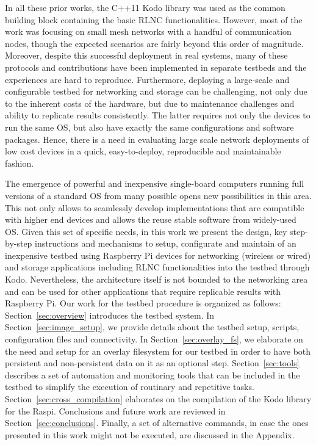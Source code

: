 In all these prior works, the C++11 Kodo library \cite{kodo2011pedersen} was used as the common building block containing the basic \ac{RLNC} functionalities. However, most of the work was focusing on small mesh networks with a handful of communication nodes, though the expected scenarios are fairly beyond this order of magnitude. Moreover, despite this successful deployment in real systems, many of these protocols and contributions have been implemented in separate testbeds and the experiences are hard to reproduce. Furthermore, deploying a large-scale and configurable testbed for networking and storage can be challenging, not only due to the inherent costs of the hardware, but due to maintenance challenges and ability to replicate results consistently. The latter requires not only the devices to run the same \ac{OS}, but also have exactly the same configurations and software packages. Hence, there is a need in evaluating large scale network deployments of low cost devices in a quick, easy-to-deploy, reproducible and maintainable fashion.

The emergence of powerful and inexpensive single-board computers running full versions of a standard \ac{OS} from many possible opens new possibilities in this area. This not only allows to seamlessly develop implementations that are compatible with higher end devices and allows the reuse stable software from widely-used \ac{OS}. Given this set of specific needs, in this work we present the design, key step-by-step instructions and mechanisms to setup, configurate and maintain of an inexpensive testbed using Raspberry Pi devices for networking (wireless or wired) and storage applications including \ac{RLNC} functionalities into the testbed through Kodo. Nevertheless, the architecture itself is not bounded to the networking area and can be used for other applications that require replicable results with Raspberry Pi. Our work for the testbed procedure is organized as follows: Section~\ref{sec:overview} introduces the testbed system. In Section~\ref{sec:image_setup}, we provide details about the testbed setup, scripts, configuration files and connectivity. In Section~\ref{sec:overlay_fs}, we elaborate on the need and setup for an overlay filesystem for our testbed in order to have both persistent and non-persistent data on it as an optional step. Section~\ref{sec:tools} describes a set of automation and monitoring tools that can be included in the testbed to simplify the execution of routinary and repetitive tasks. Section~\ref{sec:cross_compilation} elaborates on the compilation of the Kodo library for the \ac{Raspi}. Conclusions and future work are reviewed in Section~\ref{sec:conclusions}. Finally, a set of alternative commands, in case the ones presented in this work might not be executed, are discussed in the Appendix.

